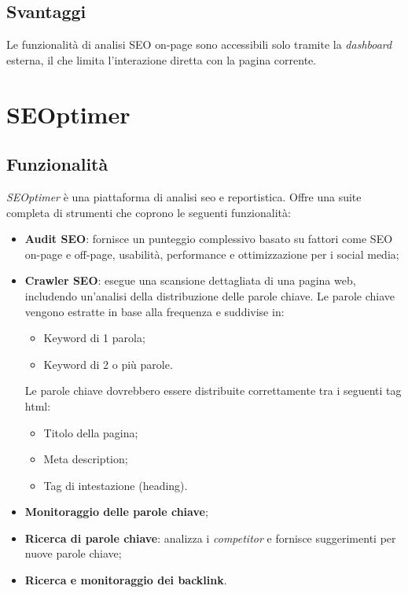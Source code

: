 \subsection{Svantaggi}
\par Le funzionalità di analisi SEO \gls{on-page} sono accessibili solo tramite la \textit{dashboard} esterna, il che limita l'interazione diretta con la pagina corrente.

\section{SEOptimer}

\subsection{Funzionalità}
\par \textit{SEOptimer} è una piattaforma di analisi \gls{seo} e reportistica. Offre una suite completa di strumenti che coprono le seguenti funzionalità:
\begin{itemize}
    \item \textbf{Audit SEO}: fornisce un punteggio complessivo basato su fattori come SEO \gls{on-page} e \gls{off-page}, usabilità, performance e ottimizzazione per i social media;
    \item \textbf{Crawler SEO}: esegue una scansione dettagliata di una pagina web, includendo un'analisi della distribuzione delle parole chiave. Le parole chiave vengono estratte in base alla frequenza e suddivise in:
    \begin{itemize}
        \item Keyword di 1 parola;
        \item Keyword di 2 o più parole.
    \end{itemize}
    Le parole chiave dovrebbero essere distribuite correttamente tra i seguenti tag \gls{html}: 
    \begin{itemize}
        \item Titolo della pagina;
        \item Meta description;
        \item Tag di intestazione (heading).
    \end{itemize}
    \item \textbf{Monitoraggio delle parole chiave};
    \item \textbf{Ricerca di parole chiave}: analizza i \textit{competitor} e fornisce suggerimenti per nuove parole chiave;
    \item \textbf{Ricerca e monitoraggio dei \gls{backlink}}.
\end{itemize}

